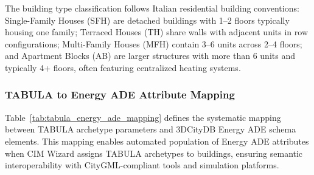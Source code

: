 The building type classification follows Italian residential building conventions: Single-Family Houses (SFH) are detached buildings with 1--2 floors typically housing one family; Terraced Houses (TH) share walls with adjacent units in row configurations; Multi-Family Houses (MFH) contain 3--6 units across 2--4 floors; and Apartment Blocks (AB) are larger structures with more than 6 units and typically 4+ floors, often featuring centralized heating systems.

\subsubsection{TABULA to Energy ADE Attribute Mapping}

Table~\ref{tab:tabula_energy_ade_mapping} defines the systematic mapping between TABULA archetype parameters and 3DCityDB Energy ADE schema elements. This mapping enables automated population of Energy ADE attributes when CIM Wizard assigns TABULA archetypes to buildings, ensuring semantic interoperability with CityGML-compliant tools and simulation platforms.

